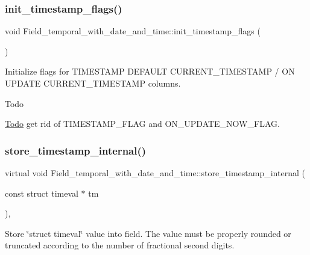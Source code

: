 \subsubsection{\texorpdfstring{init\+\_\+timestamp\+\_\+flags()}{init\_timestamp\_flags()}}
{\footnotesize\ttfamily void Field\+\_\+temporal\+\_\+with\+\_\+date\+\_\+and\+\_\+time\+::init\+\_\+timestamp\+\_\+flags (\begin{DoxyParamCaption}{ }\end{DoxyParamCaption})\hspace{0.3cm}{\ttfamily [protected]}}

Initialize flags for T\+I\+M\+E\+S\+T\+A\+MP D\+E\+F\+A\+U\+LT C\+U\+R\+R\+E\+N\+T\+\_\+\+T\+I\+M\+E\+S\+T\+A\+MP / ON U\+P\+D\+A\+TE C\+U\+R\+R\+E\+N\+T\+\_\+\+T\+I\+M\+E\+S\+T\+A\+MP columns.

\begin{DoxyRefDesc}{Todo}
\item[\mbox{\hyperlink{todo__todo000014}{Todo}}]get rid of T\+I\+M\+E\+S\+T\+A\+M\+P\+\_\+\+F\+L\+AG and O\+N\+\_\+\+U\+P\+D\+A\+T\+E\+\_\+\+N\+O\+W\+\_\+\+F\+L\+AG. \end{DoxyRefDesc}
\mbox{\label{classField__temporal__with__date__and__time_a3cfd6dc59b102362d592341dbf40a19e}} 
\subsubsection{\texorpdfstring{store\+\_\+timestamp\+\_\+internal()}{store\_timestamp\_internal()}}
{\footnotesize\ttfamily virtual void Field\+\_\+temporal\+\_\+with\+\_\+date\+\_\+and\+\_\+time\+::store\+\_\+timestamp\+\_\+internal (\begin{DoxyParamCaption}\item[{const struct timeval $\ast$}]{tm }\end{DoxyParamCaption})\hspace{0.3cm}{\ttfamily [protected]}, {}}

Store \char`\"{}struct timeval\char`\"{} value into field. The value must be properly rounded or truncated according to the number of fractional second digits. 

